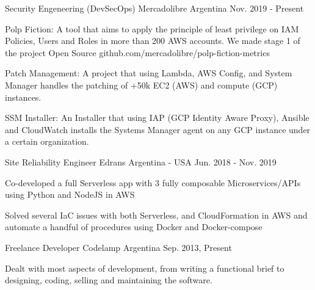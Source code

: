 

\begin{cventries}
\cventry
{Security Engeneering (DevSecOps)} %
{Mercadolibre} %
{Argentina} %
{Nov. 2019 - Present} %
{
\begin{cvitems} %
\item {Polp Fiction: A tool that aims to apply the principle of least privilege on IAM Policies, Users and Roles in more than 200 AWS accounts. We made stage 1 of the project Open Source github.com/mercadolibre/polp-fiction-metrics}
\item {Patch Management: A project that using  Lambda, AWS Config, and System Manager handles the patching of +50k EC2 (AWS) and compute (GCP) instances.}
\item {SSM Installer: An Installer that using IAP (GCP Identity Aware Proxy), Ansible and CloudWatch installs the Systems Manager agent on any GCP instance under a certain organization.}
\end{cvitems}
}

\cventry
{Site Reliability Engineer} %
{Edrans} %
{Argentina - USA} %
{Jun. 2018 - Nov. 2019} %
{
\begin{cvitems} %
\item {Co-developed a full Serverless app with 3 fully composable Microservices/APIs using Python and NodeJS in AWS}
\item {Solved several IaC issues with both Serverless, and CloudFormation in AWS and automate a handful of procedures using Docker and Docker-compose}
\end{cvitems}
}

\cventry
{Freelance Developer} %
{Codelamp} %
{Argentina} %
{Sep. 2013, Present} %
{
\begin{cvitems}
    \item {Dealt with most aspects of development, from writing a functional brief to designing, coding, selling and maintaining the software.}
\end{cvitems}
}


\end{cventries}
